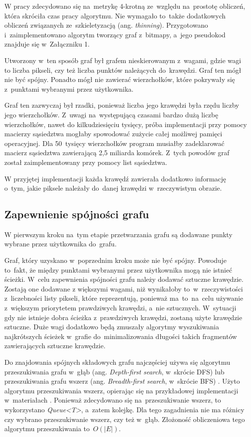 \documentclass[a4paper,11pt,twoside,openright]{report}
\theoremstyle{definition}
\begin{document}
\bigskip

W pracy zdecydowano się na~metrykę 4-krotną ze~względu na~prostotę obliczeń,
która skróciła czas pracy algorytmu. Nie wymagało to~także dodatkowych
obliczeń związanych ze~szkieletyzacją (ang. \textit{thinning}). Przygotowano
i~zaimplementowano algorytm tworzący graf z~bitmapy, a~jego pseudokod znajduje
się w~Załączniku 1.

Utworzony w~ten sposób graf był grafem nieskierowanym z~wagami, gdzie wagi to
liczba pikseli, czy też liczba punktów należących do~krawędzi. Graf ten mógł nie być
spójny. Ponadto mógł nie zawierać wierzchołków, które pokrywały się z~punktami
wybranymi przez użytkownika.

Graf ten zazwyczaj był rzadki, ponieważ liczba jego krawędzi była rzędu liczby
jego wierzchołków.  Z~uwagi na~występującą czasami bardzo dużą liczbę wierzchołków, nawet
do kilkudziesięciu tysięcy, próba implementacji przy pomocy macierzy sąsiedztwa
mogłaby spowodować zużycie całej możliwej pamięci operacyjnej. Dla 50~tysięcy
wierzchołków program musiałby zadeklarować macierz sąsiedztwa zawierającą 2,5
miliarda komórek. Z~tych powodów graf został zaimplementowany przy pomocy list sąsiedztwa.

W przyjętej implementacji każda krawędź zawierała dodatkowo informację o~tym, jakie
piksele należały do~danej krawędzi w~rzeczywistym obrazie.

\subsection {Zapewnienie spójności grafu}

W pierwszym kroku na~tym etapie przetwarzania grafu są dodawane punkty wybrane
przez użytkownika do~grafu.

Graf, który uzyskano w~poprzednim kroku może nie być spójny. Powoduje to~fakt,
że między punktami wybranymi przez użytkownika mogą nie istnieć ścieżki. W~celu
zapewnienia spójności grafu należy dodawać sztuczne krawędzie. Zostają one dodawane
z większymi wagami, niż wynikałoby to~w~rzeczywistości z~liczebności listy pikseli,
które reprezentują, ponieważ ma~to~na~celu używanie z~większym priorytetem prawdziwych
krawędzi, a~nie sztucznych. W~sytuacji gdy nie istnieje dobra ścieżka z~prawdziwych
krawędzi, zostaną użyte krawędzie sztuczne. Duże wagi dodatkowo będą zmuszały
algorytmy wyszukiwania najkrótszych ścieżek w~grafie do~minimalizowania długości
takich fragmentów zawierających sztuczne krawędzie.

Do znajdowania spójnych składowych grafu najczęściej używa się algorytmu
przeszukiwania grafu w~głąb (ang. \textit{Depth-first search}, w~skrócie DFS) lub
przeszukiwania grafu wszerz (ang. \textit{Breadth-first search}, w~skrócie BFS)
\cite{Algorytmy Sedgewick}. Użyto algorytmu przeszukiwania wszerz, opierając się
na przykładowej implementacji w~materiałach \cite{AiSD2}. Ponieważ zdecydowano się
na~przeszukiwanie wszerz, to wykorzystano \textit{Queue<T>}, a~zatem kolejkę. Dla tego zagadnienia
nie ma różnicy czy wybrano przeszukiwanie wszerz, czy też w~głąb. Złożoność
obliczeniowa tego algorytmu przeszukiwania to~$O(|E|)$.
\end{document}
